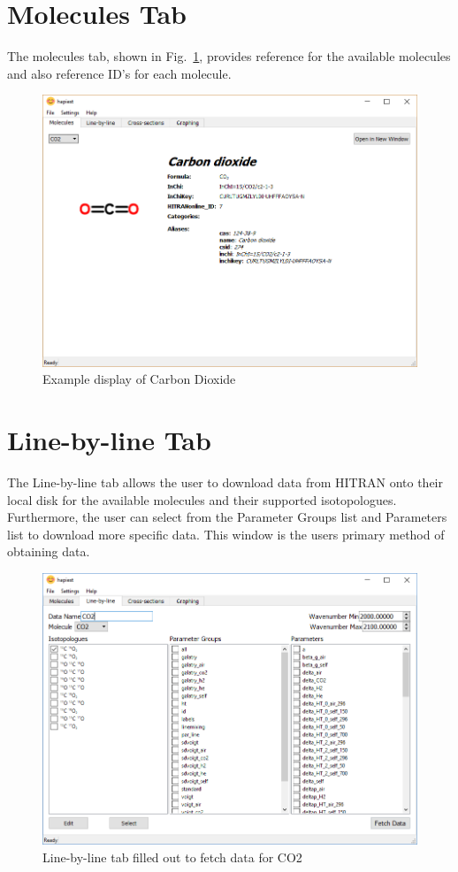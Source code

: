 \documentclass[12pt]{article}
\begin{document}
\newpage

\section{Molecules Tab}
The molecules tab, shown in Fig.~\ref{fig:molecules}, provides reference for the available molecules and also reference ID's for each molecule.
\begin{figure}[h]
\centering
    \includegraphics[scale=1]{hapiest_molecules.png}
\caption{Example display of Carbon Dioxide}
\label{fig:molecules}
\end{figure}


\section{Line-by-line Tab}
The Line-by-line tab allows the user to download data from HITRAN onto their local disk for the available molecules and their supported isotopologues. Furthermore, the user can select from the Parameter Groups list and Parameters list to download more specific data. This window is the users primary method of obtaining data.
\begin{figure}[h]
\centering
\includegraphics[scale = 0.6]{hapiest_line_by_line.png}
\caption{Line-by-line tab filled out to fetch data for CO2}
\label{fig:line-by-line}
\end{figure}
\end{document}
